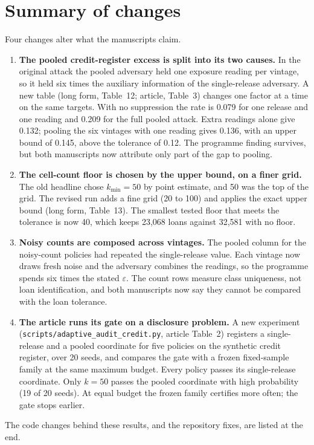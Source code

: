 \documentclass[11pt,a4paper]{article}
\begin{document}
\section*{Summary of changes}
Four changes alter what the manuscripts claim.
\begin{enumerate}
\item \textbf{The pooled credit-register excess is split into its two causes.} In the
original attack the pooled adversary held one exposure reading per vintage, so it held
six times the auxiliary information of the single-release adversary. A new table
(long form, Table~12; article, Table~3) changes one factor
at a time on the same targets. With no suppression the rate is 0.079 for one release
and one reading and 0.209 for the full pooled attack. Extra readings alone give 0.132;
pooling the six vintages with one reading gives 0.136, with an upper bound of 0.145,
above the tolerance of 0.12. The programme finding survives, but both manuscripts now
attribute only part of the gap to pooling.
\item \textbf{The cell-count floor is chosen by the upper bound, on a finer grid.} The
old headline chose $k_{\min}=50$ by point estimate, and 50 was the top of the grid. The
revised run adds a fine grid (20 to 100) and applies the exact upper bound (long form, Table~13). The smallest
tested floor that meets the tolerance is now 40, which keeps 23,068 loans against 32,581
with no floor.
\item \textbf{Noisy counts are composed across vintages.} The pooled column for the
noisy-count policies had repeated the single-release value. Each vintage now draws fresh
noise and the adversary combines the readings, so the programme spends six times the
stated $\varepsilon$. The count rows measure class uniqueness, not loan identification,
and both manuscripts now say they cannot be compared with the loan tolerance.
\item \textbf{The article runs its gate on a disclosure problem.} A new experiment
(\texttt{scripts/adaptive\_audit\_credit.py}, article Table~2) registers a
single-release and a pooled coordinate for five policies on the synthetic credit
register, over 20 seeds, and compares the gate with a frozen fixed-sample family at the
same maximum budget. Every policy passes its single-release coordinate. Only $k=50$
passes the pooled coordinate with high probability (19 of 20 seeds). At equal budget the
frozen family certifies more often; the gate stops earlier.
\end{enumerate}
The code changes behind these results, and the repository fixes, are listed at the end.
\end{document}
